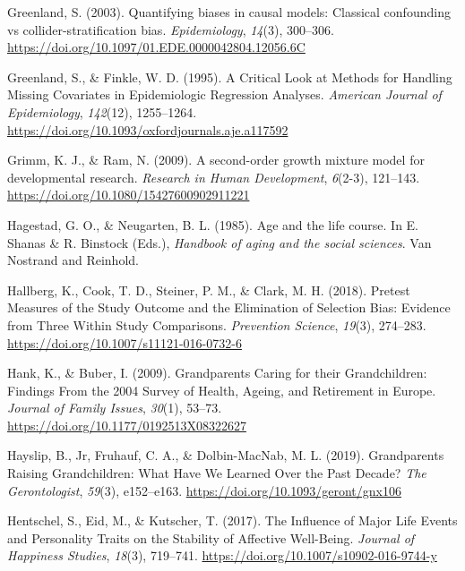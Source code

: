 \documentclass[
  english,
  man, noextraspace,floatsintext]{apa7}
\begin{document}
\leavevmode\hypertarget{ref-greenlandQuantifyingBiasesCausal2003}{}%
Greenland, S. (2003). Quantifying biases in causal models: Classical confounding vs collider-stratification bias. \emph{Epidemiology}, \emph{14}(3), 300--306. \url{https://doi.org/10.1097/01.EDE.0000042804.12056.6C}

\leavevmode\hypertarget{ref-greenlandCriticalLookMethods1995}{}%
Greenland, S., \& Finkle, W. D. (1995). A Critical Look at Methods for Handling Missing Covariates in Epidemiologic Regression Analyses. \emph{American Journal of Epidemiology}, \emph{142}(12), 1255--1264. \url{https://doi.org/10.1093/oxfordjournals.aje.a117592}

\leavevmode\hypertarget{ref-grimmSecondorderGrowthMixture2009}{}%
Grimm, K. J., \& Ram, N. (2009). A second-order growth mixture model for developmental research. \emph{Research in Human Development}, \emph{6}(2-3), 121--143. \url{https://doi.org/10.1080/15427600902911221}

\leavevmode\hypertarget{ref-hagestadAgeLifeCourse1985}{}%
Hagestad, G. O., \& Neugarten, B. L. (1985). Age and the life course. In E. Shanas \& R. Binstock (Eds.), \emph{Handbook of aging and the social sciences}. Van Nostrand and Reinhold.

\leavevmode\hypertarget{ref-hallbergPretestMeasuresStudy2018}{}%
Hallberg, K., Cook, T. D., Steiner, P. M., \& Clark, M. H. (2018). Pretest Measures of the Study Outcome and the Elimination of Selection Bias: Evidence from Three Within Study Comparisons. \emph{Prevention Science}, \emph{19}(3), 274--283. \url{https://doi.org/10.1007/s11121-016-0732-6}

\leavevmode\hypertarget{ref-hankGrandparentsCaringTheir2009}{}%
Hank, K., \& Buber, I. (2009). Grandparents Caring for their Grandchildren: Findings From the 2004 Survey of Health, Ageing, and Retirement in Europe. \emph{Journal of Family Issues}, \emph{30}(1), 53--73. \url{https://doi.org/10.1177/0192513X08322627}

\leavevmode\hypertarget{ref-hayslipGrandparentsRaisingGrandchildren2019}{}%
Hayslip, B., Jr, Fruhauf, C. A., \& Dolbin-MacNab, M. L. (2019). Grandparents Raising Grandchildren: What Have We Learned Over the Past Decade? \emph{The Gerontologist}, \emph{59}(3), e152--e163. \url{https://doi.org/10.1093/geront/gnx106}

\leavevmode\hypertarget{ref-hentschelInfluenceMajorLife2017}{}%
Hentschel, S., Eid, M., \& Kutscher, T. (2017). The Influence of Major Life Events and Personality Traits on the Stability of Affective Well-Being. \emph{Journal of Happiness Studies}, \emph{18}(3), 719--741. \url{https://doi.org/10.1007/s10902-016-9744-y}
\end{document}
